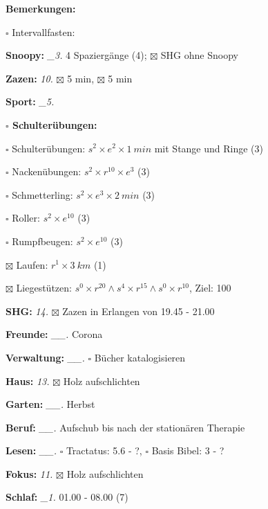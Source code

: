 \documentclass[10pt,a4paper]{article}
\newcommand\prop[1] {{\color {alizarin} {\bf #1}}}             %
\newcommand\mand[1] {{\color {burntorange} {\bf #1}}}          %
\newcommand\topspace{\vskip -15pt \hskip 20pt}
\newcommand\bottomspace{\vskip 4pt}
\newcommand\n[1] { {\sl #1.} \hskip 5pt }
\begin{document}
\begin{mdframed}[style=daystyle]
\begin{labeling}{{\mand {Bemerkungen:}}}
\begin{minipage}{0.75\textwidth}
\begin{labeling}{$\square$ Intervallfasten:}
      \end{labeling}
    \end{minipage}
      \bottomspace
  \item[{\mand {Snoopy:}}]        \n{\_3} 4 Spaziergänge (4); $\boxtimes$ SHG ohne Snoopy
  \item[{\mand {Zazen:}}]          \n{10} $\boxtimes$ 5 min, $\boxtimes$ 5 min
  \item[{\mand {Sport:}}]         \n{\_5}
    \topspace
    \begin{minipage}{0.75\textwidth}  
      \begin{labeling}{\prop {$\square$ {Schulterübungen:}}} 
        \setlength\itemsep{-3pt}
      \item[$\square$ Schulterübungen:] $s^2 \times e^2 \times 1\ min$ mit Stange und Ringe (3)
      \item[$\square$ Nackenübungen:]   $s^2 \times r^{10} \times e^3$ (3)
      \item[$\square$ Schmetterling:]   $s^2 \times e^3 \times 2\ min$ (3)
      \item[$\square$ Roller:]          $s^2 \times e^{10}$ (3)
      \item[$\square$ Rumpfbeugen:]     $s^2 \times e^{10}$ (3)
      \item[$\boxtimes$ Laufen:]        $r^1 \times 3\ km$ (1)
      \item[$\boxtimes$ Liegestützen:]  $s^0 \times r^{20} \land s^4 \times r^{15} \land s^0 \times r^{10}$, Ziel: 100
      \end{labeling}
    \end{minipage}
    \bottomspace        
  \item[{\mand {SHG:}}]            \n{14} $\boxtimes$ Zazen in Erlangen von 19.45 - 21.00
  \item[{\mand {Freunde:}}]      \n{\_\_} Corona
  \item[{\mand {Verwaltung:}}]   \n{\_\_} $\square$ Bücher katalogisieren
  \item[{\mand {Haus:}}]           \n{13} $\boxtimes$ Holz aufschlichten
  \item[{\mand {Garten:}}]       \n{\_\_} Herbst
  \item[{\mand {Beruf:}}]        \n{\_\_} Aufschub bis nach der stationären Therapie
  \item[{\mand {Lesen:}}]        \n{\_\_} $\square$ Tractatus: 5.6 - ?, $\square$ Basis Bibel: 3 - ?
  \item[{\mand {Fokus:}}]          \n{11} $\boxtimes$ Holz aufschlichten
  \item[{\mand {Schlaf:}}]        \n{\_1} 01.00 - 08.00 (7)

\end{labeling}
\end{mdframed}
\end{document}
